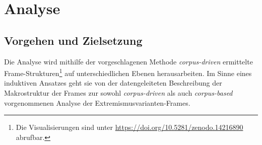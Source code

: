 \chapter{Analyse}\label{analyse}

\section{Vorgehen und Zielsetzung}\label{vorgehen-und-zielsetzung}

Die Analyse wird mithilfe der vorgeschlagenen Methode \emph{corpus-driven} ermittelte Frame-Strukturen\footnote{Die Visualisierungen sind unter \url{https://doi.org/10.5281/zenodo.14216890} abrufbar.} auf unterschiedlichen Ebenen herausarbeiten. Im Sinne eines induktiven Ansatzes geht sie von der datengeleiteten Beschreibung der Makrostruktur der Frames zur sowohl \emph{corpus-driven} als auch \emph{corpus-based} vorgenommenen Analyse der Extremismusvarianten-Frames.

